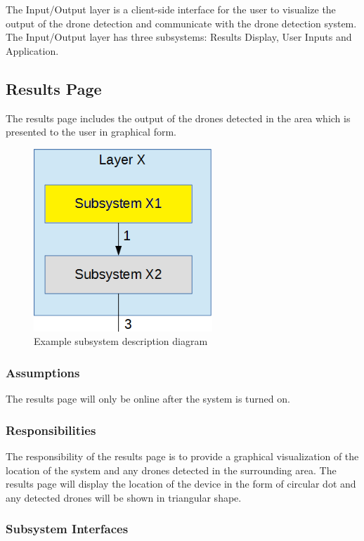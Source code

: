 The Input/Output layer is a client-side interface for the user to visualize the output of the drone detection and communicate with the drone detection system. The Input/Output layer has three subsystems: Results Display, User Inputs and Application.

\subsection{Results Page}
The results page includes the output of the drones detected in the area which is presented to the user in graphical form. 


\begin{figure}[h!]
	\centering
 	\includegraphics[width=0.60\textwidth]{images/subsystem}
 \caption{Example subsystem description diagram}
\end{figure}

\subsubsection{Assumptions}
The results page will only be online after the system is turned on.

\subsubsection{Responsibilities}
The responsibility of the results page is to provide a graphical visualization of the location of the system and any drones detected in the surrounding area. The results page will display the location of the device in the form of circular dot and any detected drones will be shown in triangular shape.

\subsubsection{Subsystem Interfaces}

